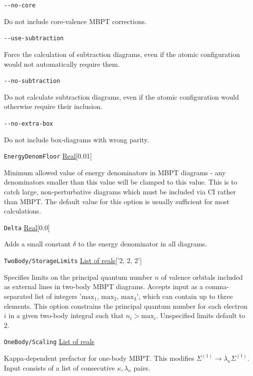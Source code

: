 \documentclass{report}
\begin{document}
\texttt{{-}{-}no-core}
\begin{adjustwidth}{1cm}{}
Do not include core-valence MBPT corrections.
\end{adjustwidth}

\texttt{{-}{-}use-subtraction}
\begin{adjustwidth}{1cm}{}
Force the calculation of subtraction diagrams, even if the atomic configuration would not automatically
require them.
\end{adjustwidth}

\texttt{{-}{-}no-subtraction}
\begin{adjustwidth}{1cm}{}
Do not calculate subtraction diagrams, even if the atomic configuration would otherwise require their
inclusion.
\end{adjustwidth}

\texttt{{-}{-}no-extra-box}
\begin{adjustwidth}{1cm}{}
Do not include box-diagrams with wrong parity.
\end{adjustwidth}

\texttt{EnergyDenomFloor} \uline{Real}[0.01]
\begin{adjustwidth}{1cm}{}
Minimum allowed value of energy denominators in MBPT diagrams - any denominators smaller than this value
will be clamped to this value. This is to catch large, non-perturbative diagrams which must be
included via CI rather than MBPT. The default value for this option is usually sufficient for most 
calculations.
\end{adjustwidth}

\texttt{Delta} \uline{Real}[0.0]
\begin{adjustwidth}{1cm}{}
Adds a small constant $\delta$ to the energy denominator in all diagrams.
\end{adjustwidth}

\texttt{TwoBody/StorageLimits} \uline{List of reals}['2, 2, 2']
\begin{adjustwidth}{1cm}{}
Specifies limits on the principal quantum number $n$ of
valence orbitals included as external lines in two-body MBPT diagrams. Accepts input as a 
comma-separated list of integers '$\mathrm{max}_1$, $\mathrm{max}_2$, $\mathrm{max}_3$', which can 
contain up to three elements. This option constrains the principal quantum number for each electron $i$ 
in a given two-body integral such that $n_i > \mathrm{max}_i$. Unspecified limits default to 2.
\end{adjustwidth}

\texttt{OneBody/Scaling} \uline{List of reals}
\begin{adjustwidth}{1cm}{}
Kappa-dependent prefactor for one-body MBPT. This modifies $\Sigma^{(1)} \to \lambda_{\kappa}
\Sigma^{(1)}$. Input consists of a list of consecutive $\kappa, \lambda_{\kappa}$ pairs.
\end{adjustwidth}
\end{document}
